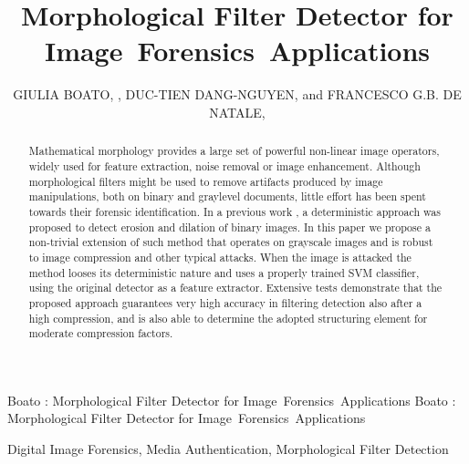 \documentclass{ieeeaccess}
\begin{document}

\title{Morphological Filter Detector for Image~Forensics~Applications}
\author{\uppercase{Giulia Boato}, ,
\uppercase{Duc-Tien Dang-Nguyen},  and \uppercase{Francesco G.B. De Natale},}
\address[1]{University of Trento, Italy (e-mail: boato@disi.unitn.it; denatale@ing.unitn.it)}
\address[2]{University of Bergen, Norway(e-mail: ductien.dangnguyen@uib.no)}

\markboth
{Boato \headeretal: Morphological Filter Detector for Image~Forensics~Applications}
{Boato \headeretal: Morphological Filter Detector for Image~Forensics~Applications}


\begin{abstract}
Mathematical morphology provides a large set of powerful non-linear image operators, widely used for feature extraction, noise removal or image enhancement. Although morphological filters might be used to remove artifacts produced by image manipulations, both on binary and graylevel documents, little effort has been spent towards their forensic identification. In a previous work \cite{de2017detecting}, a deterministic approach was proposed to detect erosion and dilation of binary images. In this paper we propose a non-trivial extension of such method that operates on grayscale images and is robust to image compression and other typical attacks. When the image is attacked the method looses its deterministic nature and uses a properly trained SVM classifier, using the original detector as a feature extractor. Extensive tests demonstrate that the proposed approach guarantees very high accuracy in filtering detection also after a high compression, and is also able to determine the adopted structuring element for moderate compression factors.
\end{abstract}

\begin{keywords}
Digital Image Forensics, Media Authentication, Morphological Filter Detection
%
\end{keywords}
\end{document}
